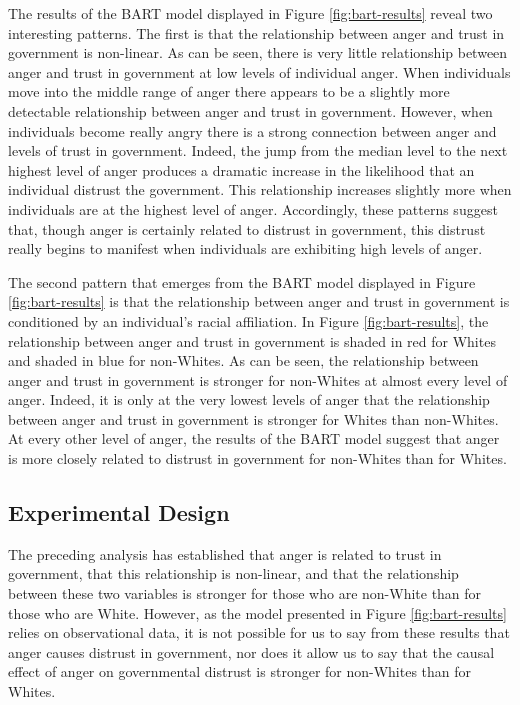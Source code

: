 \documentclass[12t, letterpaper]{article}
\begin{document}
The results of the BART model displayed in Figure \ref{fig:bart-results} reveal two interesting patterns. The first is that the relationship between anger and trust in government is non-linear. As can be seen, there is very little relationship between anger and trust in government at low levels of individual anger. When individuals move into the middle range of anger there appears to be a slightly more detectable relationship between anger and trust in government. However, when individuals become really angry there is a strong connection between anger and levels of trust in government. Indeed, the jump from the median level to the next highest level of anger produces a dramatic increase in the likelihood that an individual distrust the government. This relationship increases slightly more when individuals are at the highest level of anger. Accordingly, these patterns suggest that, though anger is certainly related to distrust in government, this distrust really begins to manifest when individuals are exhibiting high levels of anger.

The second pattern that emerges from the BART model displayed in Figure \ref{fig:bart-results} is that the relationship between anger and trust in government is conditioned by an individual's racial affiliation. In Figure \ref{fig:bart-results}, the relationship between anger and trust in government is shaded in red for Whites and shaded in blue for non-Whites. As can be seen, the relationship between anger and trust in government is stronger for non-Whites at almost every level of anger. Indeed, it is only at the very lowest levels of anger that the relationship between anger and trust in government is stronger for Whites than non-Whites. At every other level of anger, the results of the BART model suggest that anger is more closely related to distrust in government for non-Whites than for Whites.

\subsection{Experimental Design}
\label{subsec:experiment}

The preceding analysis has established that anger is related to trust in government, that this relationship is non-linear, and that the relationship between these two variables is stronger for those who are non-White than for those who are White. However, as the model presented in Figure \ref{fig:bart-results} relies on observational data, it is not possible for us to say from these results that anger causes distrust in government, nor does it allow us to say that the causal effect of anger on governmental distrust is stronger for non-Whites than for Whites.
\end{document}
